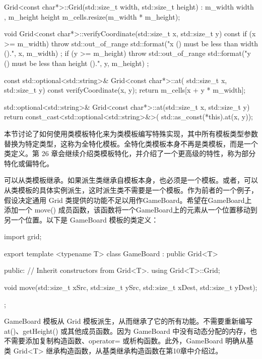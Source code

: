 \begin{cpp}
Grid<const char*>::Grid(std::size_t width, std::size_t height)
: m_width { width }, m_height { height }
{
    m_cells.resize(m_width * m_height);
}

void Grid<const char*>::verifyCoordinate(std::size_t x, std::size_t y) const
{
    if (x >= m_width) {
        throw std::out_of_range {
            std::format("x ({}) must be less than width ({}).", x, m_width) };
    }
    if (y >= m_height) {
        throw std::out_of_range {
            std::format("y ({}) must be less than height ({}).", y, m_height) };
    }
}

const std::optional<std::string>& Grid<const char*>::at(
std::size_t x, std::size_t y) const
{
    verifyCoordinate(x, y);
    return m_cells[x + y * m_width];
}

std::optional<std::string>& Grid<const char*>::at(std::size_t x, std::size_t y)
{
    return const_cast<std::optional<std::string>&>(
    std::as_const(*this).at(x, y));
}
\end{cpp}

本节讨论了如何使用类模板特化来为类模板编写特殊实现，其中所有模板类型参数替换为特定类型，这称为全特化模板。全特化类模板本身不再是类模板，而是一个类定义。第 26 章会继续介绍类模板特化，并介绍了一个更高级的特性，称为部分特化或偏特化。


可以从类模板继承。如果派生类继承自模板本身，也必须是一个模板。或者，可以从类模板的具体实例派生，这时派生类不需要是一个模板。作为前者的一个例子，假设决定通用 Grid 类提供的功能不足以用作GameBoard。希望在GameBoard上添加一个 move() 成员函数，该函数将一个GameBoard上的元素从一个位置移动到另一个位置。以下是 GameBoard 模板的类定义：

\begin{cpp}
import grid;

export template <typename T>
class GameBoard : public Grid<T>
{
    public:
        // Inherit constructors from Grid<T>.
        using Grid<T>::Grid;

        void move(std::size_t xSrc, std::size_t ySrc,
            std::size_t xDest, std::size_t yDest);
};
\end{cpp}

GameBoard 模板从 Grid 模板派生，从而继承了它的所有功能。不需要重新编写 at()、getHeight() 或其他成员函数。因为 GameBoard 中没有动态分配的内存，也不需要添加复制构造函数、operator= 或析构函数。此外，GameBoard 明确从基类 Grid<T> 继承构造函数，从基类继承构造函数在第10章中介绍过。

